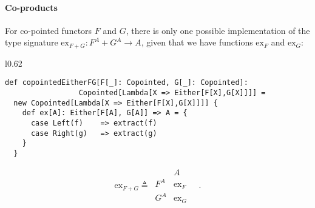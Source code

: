 \paragraph{Co-products}

For co-pointed functors $F$ and $G$, there is only one possible
implementation of the type signature $\text{ex}_{F+G}:F^{A}+G^{A}\rightarrow A$,
given that we have functions $\text{ex}_{F}$ and $\text{ex}_{G}$:

\begin{wrapfigure}{l}{0.62\columnwidth}%
\vspace{-0.85\baselineskip}
\begin{lstlisting}
def copointedEitherFG[F[_]: Copointed, G[_]: Copointed]:
                 Copointed[Lambda[X => Either[F[X],G[X]]]] =
  new Copointed[Lambda[X => Either[F[X],G[X]]]] {
    def ex[A]: Either[F[A], G[A]] => A = {
      case Left(f)    => extract(f)
      case Right(g)   => extract(g)
    }
  }
\end{lstlisting}
\vspace{-2.5\baselineskip}
\end{wrapfigure}%

\noindent \vspace{-0.15\baselineskip}
\[
\text{ex}_{F+G}\triangleq\,\begin{array}{|c||c|}
 & A\\
\hline F^{A} & \text{ex}_{F}\\
G^{A} & \text{ex}_{G}
\end{array}\quad.
\]

